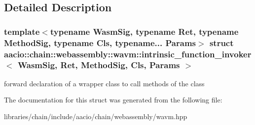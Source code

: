 \subsection{Detailed Description}
\subsubsection*{template$<$typename Wasm\+Sig, typename Ret, typename Method\+Sig, typename Cls, typename... Params$>$\newline
struct aacio\+::chain\+::webassembly\+::wavm\+::intrinsic\+\_\+function\+\_\+invoker$<$ Wasm\+Sig, Ret, Method\+Sig, Cls, Params $>$}

forward declaration of a wrapper class to call methods of the class 

The documentation for this struct was generated from the following file\+:\begin{DoxyCompactItemize}
\item 
libraries/chain/include/aacio/chain/webassembly/wavm.\+hpp\end{DoxyCompactItemize}
